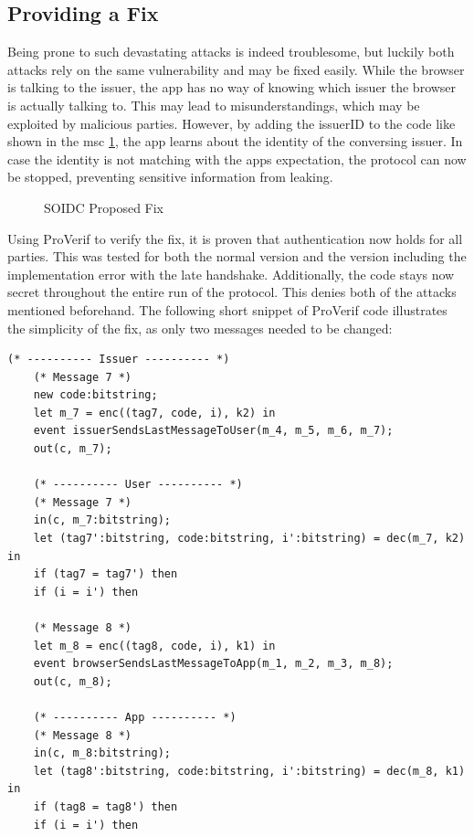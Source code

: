 \documentclass[11pt,twoside,a4paper,openright]{book}
\begin{document}
\subsection{Providing a Fix}
\label{fix_short}

Being prone to such devastating attacks is indeed troublesome, but luckily both attacks rely on the same vulnerability and may be fixed easily. While the browser is talking to the issuer, the app has no way of knowing which issuer the browser is actually talking to. This may lead to misunderstandings, which may be exploited by malicious parties. However, by adding the issuerID to the code like shown in the msc \ref{fig:msc_soidc_fix_small}, the app learns about the identity of the conversing issuer. In case the identity is not matching with the apps expectation, the protocol can now be stopped, preventing sensitive information from leaking.

\begin{figure}[H]
    \centering
    
    \caption{SOIDC Proposed Fix}
    \label{fig:msc_soidc_fix_small}
\end{figure}

Using ProVerif to verify the fix, it is proven that authentication now holds for all parties. This was tested for both the normal version and the version including the implementation error with the late handshake. Additionally, the code stays now secret throughout the entire run of the protocol. This denies both of the attacks mentioned beforehand. The following short snippet of ProVerif code illustrates the simplicity of the fix, as only two messages needed to be changed:

\begin{Verbatim}[fontsize=\small]
    (* ---------- Issuer ---------- *)
    (* Message 7 *)
    new code:bitstring;
    let m_7 = enc((tag7, code, i), k2) in
    event issuerSendsLastMessageToUser(m_4, m_5, m_6, m_7);
    out(c, m_7);

    (* ---------- User ---------- *)
    (* Message 7 *)
    in(c, m_7:bitstring);
    let (tag7':bitstring, code:bitstring, i':bitstring) = dec(m_7, k2) in
    if (tag7 = tag7') then
    if (i = i') then

    (* Message 8 *)
    let m_8 = enc((tag8, code, i), k1) in
    event browserSendsLastMessageToApp(m_1, m_2, m_3, m_8);
    out(c, m_8);

    (* ---------- App ---------- *)
    (* Message 8 *)
    in(c, m_8:bitstring);
    let (tag8':bitstring, code:bitstring, i':bitstring) = dec(m_8, k1) in
    if (tag8 = tag8') then
    if (i = i') then
\end{Verbatim}
\end{document}
